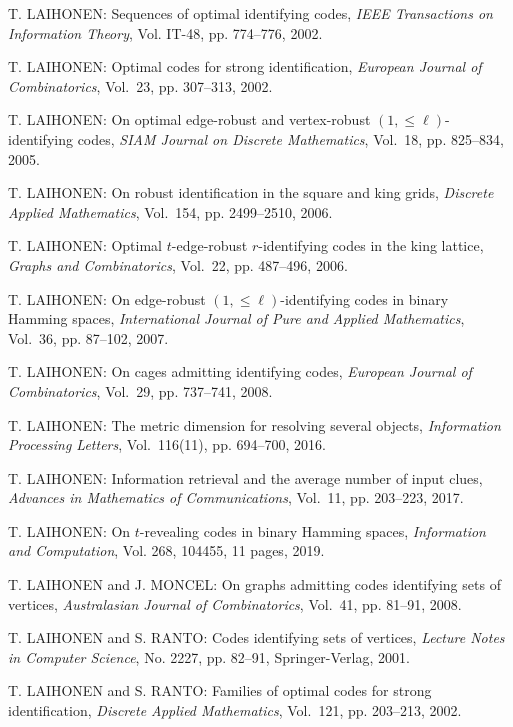 \begin{thebibliography}{999}
T. LAIHONEN: Sequences of optimal identifying codes, {\it IEEE Transactions on Information Theory}, Vol. IT-48, pp. 774--776, 2002.

T. LAIHONEN: Optimal codes for strong identification, {\it European Journal of Combinatorics}, Vol.~23, pp. 307--313, 2002.

T. LAIHONEN: On optimal edge-robust and vertex-robust $(1,\leq\ell)$-identifying codes, {\it SIAM Journal on Discrete Mathematics}, Vol.~18, pp. 825--834, 2005.

T. LAIHONEN: On robust identification in the square and king grids, {\it Discrete Applied Mathematics}, Vol.~154, pp. 2499--2510, 2006.


T. LAIHONEN: Optimal $t$-edge-robust $r$-identifying codes in the king lattice, {\it Graphs and Combinatorics}, Vol.~22, pp. 487--496, 2006.

T. LAIHONEN: On edge-robust $(1,\leq\ell)$-identifying codes in binary Hamming spaces, {\it International Journal of Pure and Applied Mathematics}, Vol.~36, pp. 87--102, 2007.

T. LAIHONEN: On cages admitting identifying codes, {\it European Journal of Combinatorics}, Vol.~29, pp. 737--741, 2008. 

T. LAIHONEN: The metric dimension for resolving several objects, {\it Information Processing Letters}, Vol.~116(11), pp. 694--700, 2016.

T. LAIHONEN: Information retrieval and the average number of input clues, {\it Advances in Mathematics of Communications}, Vol.~11, pp. 203--223, 2017.
 
T. LAIHONEN: On $t$-revealing codes in binary Hamming spaces, {\it Information and Computation}, Vol. 268, 104455, 11 pages, 2019.

T. LAIHONEN and J. MONCEL: On graphs admitting codes identifying sets of vertices, {\it Australasian Journal of Combinatorics}, Vol.~41, pp. 81--91, 2008.

T. LAIHONEN and S. RANTO: Codes identifying sets of vertices, {\it Lecture Notes in Computer Science}, No. 2227, pp. 82--91, Springer-Verlag, 2001.

T. LAIHONEN and S. RANTO: Families of optimal codes for strong identification, {\it Discrete Applied Mathematics}, Vol.~121, pp. 203--213, 2002.


\end{thebibliography}

